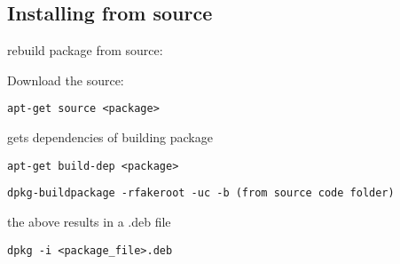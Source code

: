 
\subsection{Installing from source}

rebuild package from source:

Download the source:

\begin{verbatim}
apt-get source <package>
\end{verbatim}

gets dependencies of building package

\begin{verbatim}
apt-get build-dep <package>
\end{verbatim}




\begin{verbatim}
dpkg-buildpackage -rfakeroot -uc -b (from source code folder)
\end{verbatim}

the above results in a .deb file

\begin{verbatim}
dpkg -i <package_file>.deb
\end{verbatim}


